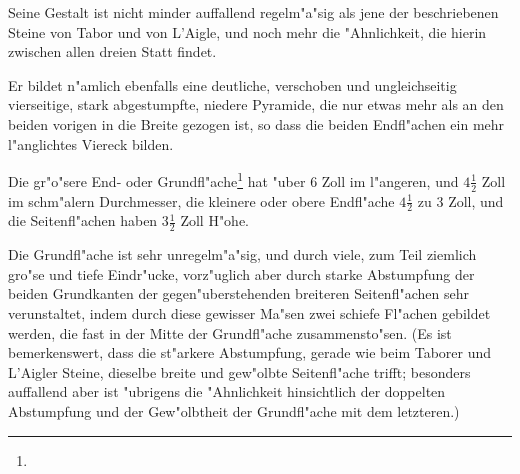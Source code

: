 \documentclass[a4paper, 11pt, oneside, german]{article}
\begin{document}
Seine Gestalt ist nicht minder auffallend regelm"a"sig als jene der beschriebenen Steine von Tabor und von L'Aigle, und noch mehr die "Ahnlichkeit, die hierin zwischen allen dreien Statt findet.

Er bildet n"amlich ebenfalls eine deutliche, verschoben und ungleichseitig vierseitige, stark abgestumpfte, niedere Pyramide, die nur etwas mehr als an den beiden vorigen in die Breite gezogen ist, so dass die beiden Endfl"achen ein mehr l"anglichtes Viereck bilden.

Die gr"o"sere End- oder Grundfl"ache\footnote{} hat "uber 6 Zoll im l"angeren, und $4\frac{1}{2}$ Zoll im schm"alern Durchmesser, die kleinere oder obere Endfl"ache $4\frac{1}{2}$ zu 3 Zoll, und die Seitenfl"achen haben $3\frac{1}{2}$ Zoll H"ohe.

Die Grundfl"ache ist sehr unregelm"a"sig, und durch viele, zum Teil ziemlich gro"se und tiefe Eindr"ucke, vorz"uglich aber durch starke Abstumpfung der beiden Grundkanten der gegen"uberstehenden breiteren Seitenfl"achen sehr verunstaltet, indem durch diese gewisser Ma"sen zwei schiefe Fl"achen gebildet werden, die fast in der Mitte der Grundfl"ache zusammensto"sen. (Es ist bemerkenswert, dass die st"arkere Abstumpfung, gerade wie beim Taborer und L'Aigler Steine, dieselbe breite und gew"olbte Seitenfl"ache trifft; besonders auffallend aber ist "ubrigens die "Ahnlichkeit hinsichtlich der doppelten Abstumpfung und der Gew"olbtheit der Grundfl"ache mit dem letzteren.)
\end{document}
